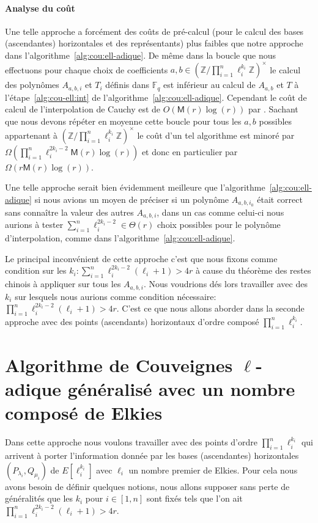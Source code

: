 \documentclass[10pt,a4paper]{book}
\theoremstyle{plain}
\theoremstyle{definition}
\theoremstyle{definition}
\theoremstyle{definition}
\theoremstyle{definition}
\theoremstyle{definition}
\theoremstyle{remark}
\theoremstyle{remark}
\theoremstyle{definition}
\begin{document}
\paragraph{Analyse du coût}
{Une telle approche a forcément des coûts de pré-calcul (pour le calcul des 
bases (ascendantes) horizontales et des représentants) plus faibles que notre 
approche dans l'algorithme~\ref{alg:cou:ell-adique}. De même dans la boucle 
que nous effectuons pour chaque choix de coefficients $a,b \in 
(\mathbb{Z}/\prod_{i=1}^n\ell_i^{k_i} \mathbb{Z})^{\times}$
le calcul des polynômes $A_{a,b,i}$ et $T_i$ définis dans $\mathbb{F}_q$ est 
inférieur au calcul de $A_{a,b}$ et $T$ à l'étape~\ref{alg:cou-ell:int} de 
l'algorithme~\ref{alg:cou:ell-adique}. Cependant le coût de calcul de 
l'interpolation de Cauchy  est de $O(\mathsf{M}(r)\log(r))$ par
 \cite[Théorème 7.5]{algeff17}. Sachant que nous devons répéter en moyenne 
cette boucle pour tous les $a,b$ possibles appartenant à $(\mathbb{Z}/
\prod_{i=1}^n\ell_i^{k_i} \mathbb{Z})^{\times}$
 le coût d'un tel algorithme est minoré par $\Omega(\prod_{i=1}^n\ell_i^{2k_i-2}
 \mathsf{M}(r)\log(r))$ et donc en particulier par $\Omega(r\mathsf{M}(r)
 \log(r))$. 

Une telle approche serait bien évidemment meilleure que 
l'algorithme~\ref{alg:cou:ell-adique} si nous avions un moyen de préciser si un 
polynôme $A_{a,b,i_0}$ était correct sans connaître la valeur des autres 
$A_{a,b,i}$, dans un cas comme celui-ci nous aurions à tester 
$\sum_{i=1}^n \ell_i^{2k_i-2} \in \Theta(r)$ choix possibles pour le polynôme 
d'interpolation, comme dans l'algorithme~\ref{alg:cou:ell-adique}.

Le principal inconvénient de cette approche 
c'est que nous fixons comme condition sur les $k_i: \sum_{i=1}^n\ell_i^{2k_{i}-2}(\ell_i+1)>4r$
à cause du théorème des restes chinois à appliquer sur tous les $A_{a,b,i}$. 
Nous voudrions dés lors travailler avec des $k_i$ sur lesquels nous aurions comme 
condition nécessaire: $\prod_{i=1}^n\ell_i^{2k_{i}-2}(\ell_i+1)>4r$.
C'est ce que nous allons aborder dans la seconde approche avec des points 
(ascendants) horizontaux d'ordre composé $\prod_{i=1}^n \ell_i^{k_i}$.}

\section{Algorithme de Couveignes $\ell$-adique généralisé avec un nombre composé de Elkies}
Dans cette approche nous voulons travailler avec des points d'ordre 
$\prod_{i=1}^{n} \ell_i^{k_i}$ qui arrivent à porter l'information donnée par 
les  bases (ascendantes) horizontales $(P_{\lambda_i},Q_{\mu_i})$ de 
$E[\ell_i^{k_i}]$ avec $\ell_i$ un nombre premier de Elkies. Pour cela 
nous avons besoin de définir quelques notions, nous allons supposer sans perte 
de généralités que les $k_i$ pour $i \in [1,n]$ sont fixés tels que l'on ait 
$\prod_{i=1}^{n} \ell_i^{2k_i-2}(\ell_i+1)>4r$.
\label{sec:cou:con}
\end{document}
